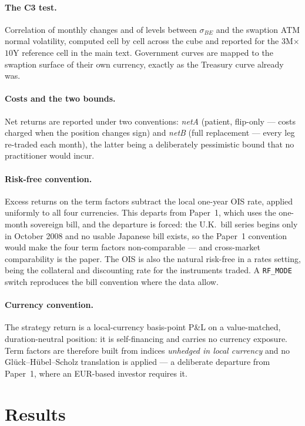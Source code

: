 \documentclass[11pt]{article}
\newcommand{\sBE}{\sigma_{BE}}
\begin{document}
\paragraph{The C3 test.} Correlation of monthly changes and of levels between $\sBE$ and the swaption
ATM normal volatility, computed cell by cell across the cube and reported for the $3$M$\times$$10$Y
reference cell in the main text. Government curves are mapped to the swaption surface of their own
currency, exactly as the Treasury curve already was.

\paragraph{Costs and the two bounds.} Net returns are reported under two conventions: \emph{netA}
(patient, flip-only --- costs charged when the position changes sign) and \emph{netB} (full
replacement --- every leg re-traded each month), the latter being a deliberately pessimistic bound
that no practitioner would incur.

\paragraph{Risk-free convention.} Excess returns on the term factors subtract the local one-year OIS
rate, applied uniformly to all four currencies. This departs from Paper~1, which uses the one-month
sovereign bill, and the departure is forced: the U.K.\ bill series begins only in October 2008 and no
usable Japanese bill exists, so the Paper~1 convention would make the four term factors
non-comparable --- and cross-market comparability is the paper. The OIS is also the natural risk-free
in a rates setting, being the collateral and discounting rate for the instruments traded. A
\texttt{RF\_MODE} switch reproduces the bill convention where the data allow.

\paragraph{Currency convention.} The strategy return is a local-currency basis-point P\&L on a
value-matched, duration-neutral position: it is self-financing and carries no currency exposure. Term
factors are therefore built from indices \emph{unhedged in local currency} and no Glück--Hübel--Scholz
translation is applied --- a deliberate departure from Paper~1, where an EUR-based investor requires it.

\section{Results}\label{sec:results}
\end{document}
